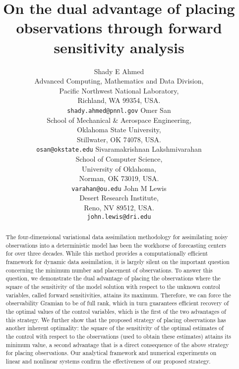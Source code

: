 \documentclass{article}
\title{On the dual advantage of placing observations through forward sensitivity analysis}
\author{
  Shady E Ahmed \\
  Advanced Computing, Mathematics and Data Division,\\
  Pacific Northwest National Laboratory,\\
  Richland, WA 99354, USA.\\
  \texttt{shady.ahmed@pnnl.gov}
  \And
  Omer San \\
  School of Mechanical \& Aerospace Engineering,\\
  Oklahoma State University,\\
  Stillwater, OK 74078, USA.\\
  \texttt{osan@okstate.edu} %
  \And
  Sivaramakrishnan Lakshmivarahan \\
  School of Computer Science,\\
  University of Oklahoma,\\
  Norman, OK 73019, USA.\\
  \texttt{varahan@ou.edu}
  \And
  John M Lewis\\
  Desert Research Institute,\\
  Reno, NV 89512, USA.\\
\texttt{john.lewis@dri.edu}
}
\begin{document}
\maketitle

\begin{abstract}
The four-dimensional variational data assimilation methodology for assimilating noisy observations into a deterministic model has been the workhorse of forecasting centers for over three decades. While this method provides a computationally efficient framework for dynamic data assimilation, it is largely silent on the important question concerning the minimum number and placement of observations. To answer this question, we demonstrate the dual advantage of placing the observations where the square of the sensitivity of the model solution with respect to the unknown control variables, called forward sensitivities, attains its maximum. Therefore, we can force the observability Gramian to be of full rank, which in turn guarantees efficient recovery of the optimal values of the control variables, which is the first of the two advantages of this strategy. We further show that the proposed strategy of placing observations has another inherent optimality: the square of the sensitivity of the optimal estimates of the control with respect to the observations (used to obtain these estimates) attains its minimum value, a second advantage that is a direct consequence of the above strategy for placing observations. Our analytical framework and numerical experiments on linear and nonlinear systems confirm the effectiveness of our proposed strategy. 
\end{abstract}


\end{document}
